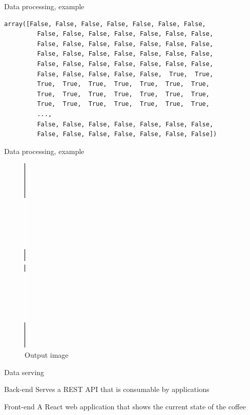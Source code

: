 \documentclass[presentation]{beamer}
\begin{document}
\begin{frame}[label={sec:org1692785},fragile]{Data processing, example}
\begin{lstlisting}
array([False, False, False, False, False, False, False,
         False, False, False, False, False, False, False,
         False, False, False, False, False, False, False,
         False, False, False, False, False, False, False,
         False, False, False, False, False, False, False,
         False, False, False, False, False,  True,  True,
         True,  True,  True,  True,  True,  True,  True,
         True,  True,  True,  True,  True,  True,  True,
         True,  True,  True,  True,  True,  True,  True,
         ...,
         False, False, False, False, False, False, False,
         False, False, False, False, False, False, False])
\end{lstlisting}
\end{frame}
\begin{frame}[label={sec:org9e8baa4}]{Data processing, example}
\begin{figure}[htbp]
\centering
\includegraphics[height=0.5\textwidth]{./figures/outputImage.png}
\caption{\label{fig:output-image}
Output image}
\end{figure}
\end{frame}
\begin{frame}[label={sec:org9f98b01}]{Data serving}
\begin{block}{Back-end}
Serves a REST API that is consumable by applications
\end{block}
\begin{block}{Front-end}
A React web application that shows the current state of the coffee
\end{block}
\end{frame}
\end{document}
